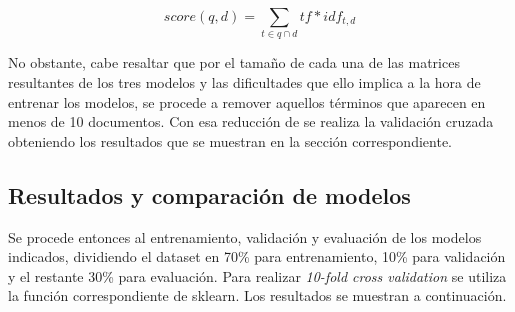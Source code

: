 \begin{equation}
    score(q,d) = \sum_{t\in q \cap d} tf * idf_{t,d}
\end{equation}

No obstante, cabe resaltar que por el tamaño de cada una de las matrices resultantes de los tres modelos y las dificultades que ello implica a la hora de entrenar los modelos, se procede a remover aquellos términos que aparecen en menos de 10 documentos. Con esa reducción de se realiza la validación cruzada obteniendo los resultados que se muestran en la sección correspondiente.

\subsection{Resultados y comparación de modelos}
Se procede entonces al entrenamiento, validación y evaluación de los modelos indicados, dividiendo el dataset en 70\% para entrenamiento, 10\% para validación y el restante 30\% para evaluación. Para realizar \textit{10-fold cross validation} se utiliza la función correspondiente de sklearn. Los resultados se muestran a continuación.

